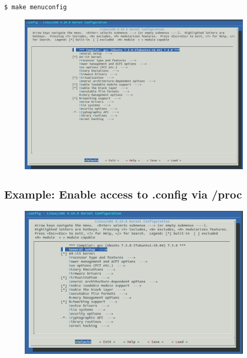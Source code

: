 \documentclass{beamer}
\begin{document}
\begin{frame}[fragile]
    \begin{lstlisting}
$ make menuconfig
    \end{lstlisting}
  \begin{figure}[h!]
    \centering
    \includegraphics[scale=0.3]{images/make-menuconfig.png}
  \end{figure}
\end{frame}

\subsection{Example: Enable access to .config via /proc}
\begin{frame}
  \begin{figure}[h!]
    \centering
    \includegraphics[scale=0.3]{images/proc-config-0.png}
  \end{figure}
\end{frame}
\end{document}
